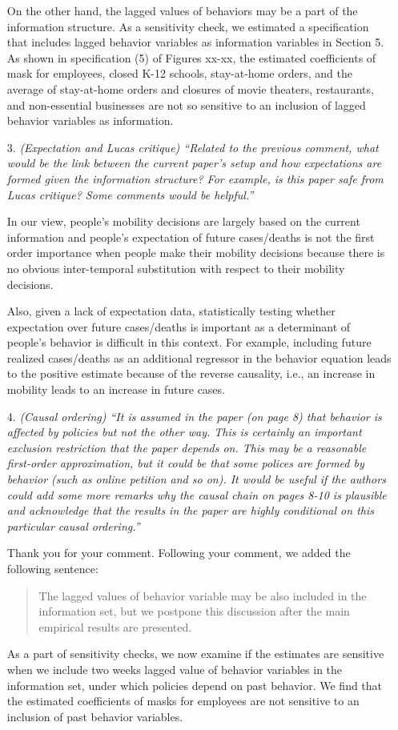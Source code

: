 \documentclass[11pt]{article}
\begin{document}
\begin{itemize}
On the other hand, the lagged values of  behaviors may be a part of the information structure. As a sensitivity check, we estimated a specification that includes  lagged behavior variables as information variables in Section 5.  As shown in specification (5) of Figures xx-xx, the estimated coefficients of mask for employees, closed K-12 schools, stay-at-home orders, and the average of stay-at-home orders and closures of movie theaters, restaurants, and non-essential businesses are not so sensitive to an inclusion of lagged behavior variables as information.
   
  
\item[3.]  \textit{(Expectation and Lucas critique) ``Related to the previous comment, what would be the link
between the current paper's setup and how expectations are formed given the information
structure? For example, is this paper safe from Lucas critique? Some comments would be
helpful.''}

In our view, people's mobility decisions are largely based on the current information and people's expectation of future cases/deaths is not the first order importance when people make their mobility decisions because there is no obvious inter-temporal substitution with respect to their mobility decisions. 
    
Also, given a lack of expectation data, statistically testing whether expectation over future cases/deaths is important as a determinant of people's behavior is difficult in this context. For example, including future realized cases/deaths as an additional regressor in the behavior equation leads to the positive estimate because of the reverse causality, i.e., an increase in mobility leads to an increase in future cases.
  
\item[4.]  \textit{(Causal ordering) ``It is assumed in the paper (on page 8) that behavior is affected by policies
but not the other way. This is certainly an important exclusion restriction that the paper
depends on. This may be a reasonable first-order approximation, but it could be that some
polices are formed by behavior (such as online petition and so on). It would be useful if
the authors could add some more remarks why the causal chain on pages 8-10 is plausible
and acknowledge that the results in the paper are highly conditional on this particular causal
ordering.''}

Thank you for your comment. Following your comment, we added the following sentence:
\begin{quote}
The  lagged values of behavior variable may be also included in the information set, but we postpone this discussion after the main empirical results are presented.
\end{quote} 
As a part of sensitivity checks, we now examine if the estimates are sensitive when we include two weeks lagged value of behavior variables in the information set, under which policies depend on past behavior. We find that the estimated coefficients of masks for employees are not sensitive to an inclusion of past behavior variables. 
 

\end{itemize}
\end{document}
